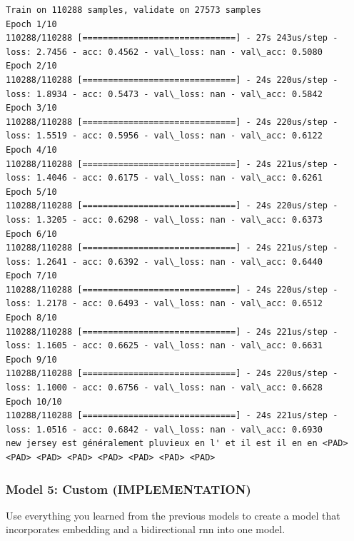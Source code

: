 \documentclass[11pt]{article}
\begin{document}
    \begin{Verbatim}[commandchars=\\\{\}]
Train on 110288 samples, validate on 27573 samples
Epoch 1/10
110288/110288 [==============================] - 27s 243us/step - loss: 2.7456 - acc: 0.4562 - val\_loss: nan - val\_acc: 0.5080
Epoch 2/10
110288/110288 [==============================] - 24s 220us/step - loss: 1.8934 - acc: 0.5473 - val\_loss: nan - val\_acc: 0.5842
Epoch 3/10
110288/110288 [==============================] - 24s 220us/step - loss: 1.5519 - acc: 0.5956 - val\_loss: nan - val\_acc: 0.6122
Epoch 4/10
110288/110288 [==============================] - 24s 221us/step - loss: 1.4046 - acc: 0.6175 - val\_loss: nan - val\_acc: 0.6261
Epoch 5/10
110288/110288 [==============================] - 24s 220us/step - loss: 1.3205 - acc: 0.6298 - val\_loss: nan - val\_acc: 0.6373
Epoch 6/10
110288/110288 [==============================] - 24s 221us/step - loss: 1.2641 - acc: 0.6392 - val\_loss: nan - val\_acc: 0.6440
Epoch 7/10
110288/110288 [==============================] - 24s 220us/step - loss: 1.2178 - acc: 0.6493 - val\_loss: nan - val\_acc: 0.6512
Epoch 8/10
110288/110288 [==============================] - 24s 221us/step - loss: 1.1605 - acc: 0.6625 - val\_loss: nan - val\_acc: 0.6631
Epoch 9/10
110288/110288 [==============================] - 24s 220us/step - loss: 1.1000 - acc: 0.6756 - val\_loss: nan - val\_acc: 0.6628
Epoch 10/10
110288/110288 [==============================] - 24s 221us/step - loss: 1.0516 - acc: 0.6842 - val\_loss: nan - val\_acc: 0.6930
new jersey est généralement pluvieux en l' et il est il en en <PAD> <PAD> <PAD> <PAD> <PAD> <PAD> <PAD> <PAD>

    \end{Verbatim}

    \subsubsection{Model 5: Custom
(IMPLEMENTATION)}\label{model-5-custom-implementation}

Use everything you learned from the previous models to create a model
that incorporates embedding and a bidirectional rnn into one model.
\end{document}
